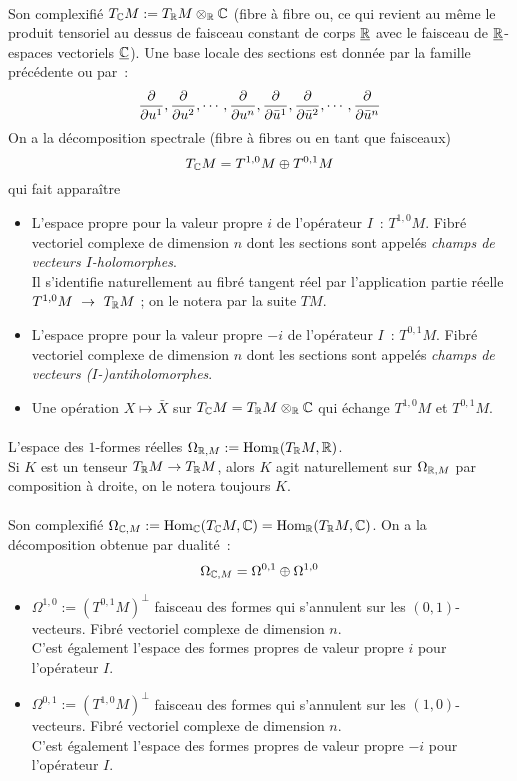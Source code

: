 \documentclass[12pt,draft]{article}
\begin{document}
\paragraph{} Son complexifié $T_{\mathbb{C}} M := T_{\mathbb{R}} M \otimes_{\mathbb{R}} \mathbb{C}$ (fibre à fibre ou, ce qui revient au même le produit tensoriel au dessus de faisceau constant de corps $\underline{\mathbb{R}}$ avec le faisceau de $\underline{\mathbb{R}}$-espaces vectoriels $\underline{\mathbb{C}}$).
Une base locale des sections est donnée par la famille précédente ou par~:
\[
\dfrac{\partial{}}{\partial{u^1}} , \dfrac{\partial{}}{\partial{u^2}} , \cdots , \dfrac{\partial{}}{\partial{u^{n}}} , \dfrac{\partial{}}{\partial{\bar{u}^1}} , \dfrac{\partial{}}{\partial{\bar{u}^2}} , \cdots , \dfrac{\partial{}}{\partial{\bar{u}^{n}}}
\]
On a la décomposition spectrale (fibre à fibres ou en tant que faisceaux)
\[
T_{\mathbb{C}} M = T^{1,0}M \oplus T^{0,1}M
\]
qui fait apparaître
\begin{itemize}
\item L'espace propre pour la valeur propre $i$ de l'opérateur $I$~: $T^{1,0}M$. Fibré vectoriel complexe de dimension $n$ dont les sections sont appelés \textit{champs de vecteurs $I$-holomorphes}.\\
Il s'identifie naturellement au fibré tangent réel par l'application partie réelle $T^{1,0}M~\rightarrow~T_{\mathbb{R}} M$ ; on le notera par la suite $TM$.
\item L'espace propre pour la valeur propre $-i$ de l'opérateur $I$~: $T^{0,1}M$. Fibré vectoriel complexe de dimension $n$ dont les sections sont appelés \textit{champs de vecteurs \mbox{($I$-)antiholomorphes}}.
\item Une opération $X \mapsto \bar{X}$ sur $T_{\mathbb{C}} M = T_{\mathbb{R}} M \otimes_{\mathbb{R}} \mathbb{C}$ qui échange $T^{1,0}M$ et $T^{0,1}M$.
\end{itemize}
\paragraph{} L'espace des $1$-formes réelles $\Omega_{\mathbb{R},M} := \text{Hom}_{\mathbb{R}}(T_{\mathbb{R}} M,\mathbb{R})$.\\
Si $K$ est un tenseur $T_{\mathbb{R}} M \rightarrow T_{\mathbb{R}} M$, alors $K$ agit naturellement sur $\Omega_{\mathbb{R},M}$ par composition à droite, on le notera toujours $K$.
\paragraph{} Son complexifié $\Omega_{\mathbb{C},M} := \text{Hom}_{\mathbb{C}}(T_{\mathbb{C}} M,\mathbb{C}) = \text{Hom}_{\mathbb{R}}(T_{\mathbb{R}} M,\mathbb{C})$. On a la décomposition obtenue par dualité~:
\[
\Omega_{\mathbb{C},M} = \Omega^{0,1} \oplus \Omega^{1,0}
\]
\begin{itemize}
\item $\Omega^{1,0} := (T^{0,1}M)^\bot$ faisceau des formes qui s'annulent sur les $(0,1)$-vecteurs. Fibré vectoriel complexe de dimension $n$.\\
C'est également l'espace des formes propres de valeur propre $i$ pour l’opérateur $I$.
\item $\Omega^{0,1} := (T^{1,0}M)^\bot$ faisceau des formes qui s'annulent sur les $(1,0)$-vecteurs. Fibré vectoriel complexe de dimension $n$.\\
C'est également l'espace des formes propres de valeur propre $-i$ pour l'opérateur $I$.
\end{itemize}
\end{document}
